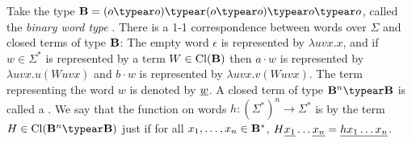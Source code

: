 Take the type $\zaiwordtyp = (o\typear o)\typear (o\typear o)\typear
o\typear o$, called the \emph{binary word type}
\cite{DBLP:journals/tcs/Zaionc87}. There is a 1-1 correspondence
between words over $\Sigma$ and closed terms of type $\mathbf{B}$:
The empty word $\epsilon$ is represented by $\lambda u v x.x$, and
if $w\in \Sigma^*$ is represented by a term $W \in
{\rm Cl}(\mathbf{B})$ then $a \cdot w$ is represented by $\lambda
u v x. u(W uvx)$ and $b \cdot w$ is represented by $\lambda u v x.
v(W uvx)$. The term representing the word $w$ is denoted by
$\underline{w}$. A closed term of type $\zaiwordtyp^n \typear
\zaiwordtyp$ is called a . We say that the
function on words $h:(\Sigma^*)^n \rightarrow \Sigma^*$ is
 by the term $H \in \closedof{\zaiwordtyp^n
\typear \zaiwordtyp}$ just if for all $x_1, \ldots, x_n \in
\mathbf{B}^*$, $H \underline{x_1} \ldots \underline{x_n} =
\underline{h x_1 \ldots x_n}$. \bigskip

